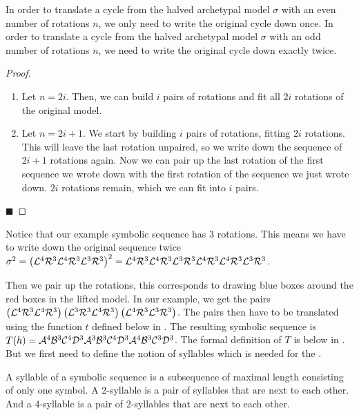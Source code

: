 \begin{lemma}
	\label{lemma:writing.down}
	In order to translate a cycle from the halved archetypal model $\sigma$ with an even number of rotations $n$, we only need to write the original cycle down once.
	In order to translate a cycle from the halved archetypal model $\sigma$ with an odd number of rotations $n$, we need to write the original cycle down exactly twice.
\end{lemma}

\begin{proof} \phantom{x}
	\begin{enumerate}
		\item Let $n = 2i$. Then, we can build $i$ pairs of rotations and fit all $2i$ rotations of the original model.
		\item Let $n = 2i + 1$. We start by building $i$ pairs of rotations, fitting $2i$ rotations.
		      This will leave the last rotation unpaired, so we write down the sequence of $2i + 1$ rotations again.
		      Now we can pair up the last rotation of the first sequence we wrote down with the first rotation of the sequence we just wrote down.
		      $2i$ rotations remain, which we can fit into $i$ pairs.
	\end{enumerate}
	\hfill $\blacksquare$
\end{proof}

Notice that our example symbolic sequence has 3 rotations.
This means we have to write down the original sequence twice
$\sigma^2 = \left(\mathcal{L}^4\mathcal{R}^3\mathcal{L}^4\mathcal{R}^3\mathcal{L}^3\mathcal{R}^3\right)^2 = \mathcal{L}^4\mathcal{R}^3\mathcal{L}^4\mathcal{R}^3\mathcal{L}^3\mathcal{R}^3\mathcal{L}^4\mathcal{R}^3\mathcal{L}^4\mathcal{R}^3\mathcal{L}^3\mathcal{R}^3$.

Then we pair up the rotations, this corresponds to drawing blue boxes around the red boxes in the lifted model.
In our example, we get the pairs $\left(\mathcal{L}^4\mathcal{R}^3\mathcal{L}^4\mathcal{R}^3\right)\left(\mathcal{L}^3\mathcal{R}^3\mathcal{L}^4\mathcal{R}^3\right)\left(\mathcal{L}^4\mathcal{R}^3\mathcal{L}^3\mathcal{R}^3\right)$.
The pairs then have to be translated using the function $t$ defined below in .
The resulting symbolic sequence is $T(h) = \mathcal{A}^4\mathcal{B}^3\mathcal{C}^4\mathcal{D}^3\mathcal{A}^3\mathcal{B}^3\mathcal{C}^4\mathcal{D}^3\mathcal{A}^4\mathcal{B}^3\mathcal{C}^3\mathcal{D}^3$.
The formal definition of $T$ is below in .
But we first need to define the notion of syllables which is needed for the .

\begin{definition}[Syllables]
	A syllable of a symbolic sequence is a subsequence of maximal length consisting of only one symbol.
	A 2-syllable is a pair of syllables that are next to each other.
	And a 4-syllable is a pair of 2-syllables that are next to each other.
\end{definition}

